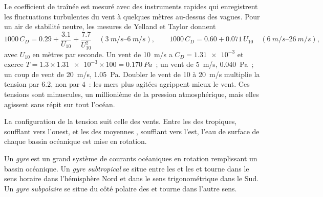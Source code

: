Le coefficient de traînée est mesuré avec des instruments rapides qui enregistrent les fluctuations
turbulentes du vent à quelques mètres au-dessus des vagues. Pour un air de stabilité neutre,
les mesures de Yelland et Taylor donnent
\[
  1000\,C_D = 0.29 + \frac{3.1}{U_{10}} + \frac{7.7}{U_{10}^2}
  \quad (\qtyrange{3}{6}{m/s}),
  \qquad
  1000\,C_D = 0.60 + 0.071\,U_{10}
  \quad (\qtyrange{6}{26}{m/s}),
\]
avec $U_{10}$ en mètres par seconde. Un vent de \qty{10}{m/s} a $C_D =
\num{1.31e-3}$ et exerce $T = 1.3 \times \num{1.31e-3} \times 100 =
\qty{0.170}{Pa}$~; un vent de \qty{5}{m/s}, \qty{0.040}{Pa}~; un coup de vent de
\qty{20}{m/s}, \qty{1.05}{Pa}. Doubler le vent de 10 à \qty{20}{m/s}
multiplie la tension par $6.2$, non par $4$~: les mers plus agitées agrippent mieux le vent. Ces
tensions sont minuscules, un millionième de la pression atmosphérique, mais elles agissent sans
répit sur tout l'océan.

La configuration de la tension suit celle des vents. Entre les  des
tropiques, soufflant vers l'ouest, et les  des moyennes , soufflant
vers l'est, l'eau de surface de chaque bassin océanique est mise en rotation.

\begin{definition}\label{def:b1:ocean-circulation:gyre}
Un \emph{gyre} est un grand système de courants océaniques en rotation remplissant un
bassin océanique. Un \emph{gyre subtropical} se situe entre les 
et les  et tourne dans le sens horaire dans l'hémisphère Nord et dans le sens
trigonométrique dans le Sud. Un \emph{gyre subpolaire} se situe du
côté polaire des  et tourne dans l'autre sens.
\end{definition}

